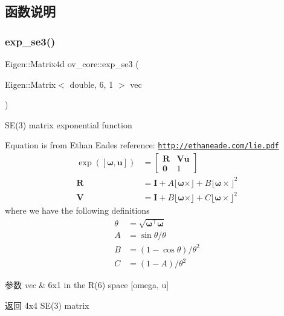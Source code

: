 \subsection{函数说明}
\mbox{\label{namespaceov__core_a8907fdb4273f23741299fb23a1c1f572}} 
\subsubsection{\texorpdfstring{exp\+\_\+se3()}{exp\_se3()}}
{\footnotesize\ttfamily Eigen\+::\+Matrix4d ov\+\_\+core\+::exp\+\_\+se3 (\begin{DoxyParamCaption}\item[{Eigen\+::\+Matrix$<$ double, 6, 1 $>$}]{vec }\end{DoxyParamCaption})\hspace{0.3cm}{\ttfamily [inline]}}



S\+E(3) matrix exponential function 

Equation is from Ethan Eade\textquotesingle{}s reference\+: \href{http://ethaneade.com/lie.pdf}{\tt http\+://ethaneade.\+com/lie.\+pdf} \begin{align*} \exp([\boldsymbol\omega,\mathbf u])&=\begin{bmatrix} \mathbf R & \mathbf V \mathbf u \\ \mathbf 0 & 1 \end{bmatrix} \\[1em] \mathbf R &= \mathbf I + A \lfloor \boldsymbol\omega \times\rfloor + B \lfloor \boldsymbol\omega \times\rfloor^2 \\ \mathbf V &= \mathbf I + B \lfloor \boldsymbol\omega \times\rfloor + C \lfloor \boldsymbol\omega \times\rfloor^2 \end{align*} where we have the following definitions \begin{align*} \theta &= \sqrt{\boldsymbol\omega^\top\boldsymbol\omega} \\ A &= \sin\theta/\theta \\ B &= (1-\cos\theta)/\theta^2 \\ C &= (1-A)/\theta^2 \end{align*}


\begin{DoxyParams}{参数}
{\em vec} & 6x1 in the R(6) space \mbox{[}omega, u\mbox{]} \\
\hline
\end{DoxyParams}
\begin{DoxyReturn}{返回}
4x4 S\+E(3) matrix 
\end{DoxyReturn}
\mbox{\label{namespaceov__core_a835a207e29f0e50ddbf66d8ddce47514}} 
